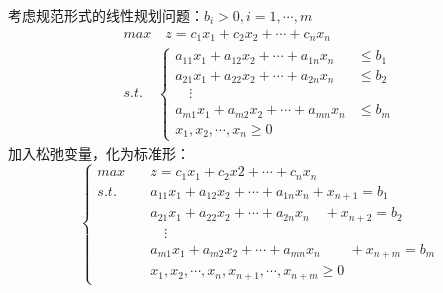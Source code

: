 \documentclass{book}
\begin{document}
考虑规范形式的线性规划问题：$b_i>0,i=1,\cdots,m$
$$
    \begin{aligned}
         & max\quad z=c_1x_1+c_2x_2+\cdots+c_nx_n & \\
         & s.t.\quad
        \begin{cases}
            a_{11}x_1+a_{12}x_2+\cdots+a_{1n}x_n & \le b_1 \\
            a_{21}x_1+a_{22}x_2+\cdots+a_{2n}x_n & \le b_2 \\
            \quad\vdots                                    \\
            a_{m1}x_1+a_{m2}x_2+\cdots+a_{mn}x_n & \le b_m \\
            x_1,x_2,\cdots,x_n\ge0
        \end{cases}
    \end{aligned}
$$
加入松弛变量，化为标准形：
\begin{equation}
    \begin{cases}
        max\quad  & z=c_1x_1+c_2x2+\cdots+c_nx_n                                \\
        s.t.\quad & a_{11}x_1+a_{12}x_2+\cdots+a_{1n}x_n +x_{n+1}=b_1           \\
                  & a_{21}x_1+a_{22}x_2+\cdots+a_{2n}x_n \quad+x_{n+2}=b_2      \\
                  & \quad\vdots                                                 \\
                  & a_{m1}x_1+a_{m2}x_2+\cdots+a_{mn}x_n \quad\quad+x_{n+m}=b_m \\
                  & x_1,x_2,\cdots,x_n,x_{n+1},\cdots,x_{n+m}\ge0
    \end{cases}
    \label{con: eq2.2}
\end{equation}
\end{document}

